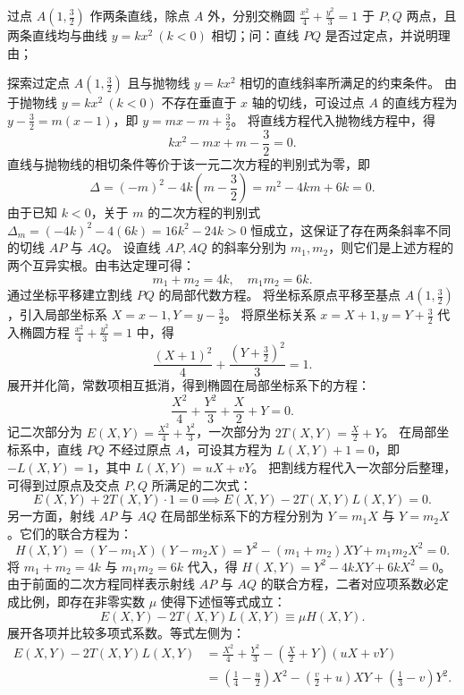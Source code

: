 \begin{example}
过点 \(A\left(1,\frac{3}{2}\right)\) 作两条直线，除点 \(A\) 外，分别交椭圆 \(\frac{x^2}{4} + \frac{y^2}{3} = 1\) 于 \(P,Q\) 两点，且两条直线均与曲线 \(y = kx^2\ (k < 0)\) 相切；问：直线 \(PQ\) 是否过定点，并说明理由；
\end{example}
\begin{solution}
探索过定点 $A\left(1, \frac{3}{2}\right)$ 且与抛物线 $y = kx^2$ 相切的直线斜率所满足的约束条件。
由于抛物线 $y = kx^2\ (k < 0)$ 不存在垂直于 $x$ 轴的切线，可设过点 $A$ 的直线方程为 $y - \frac{3}{2} = m(x - 1)$，即 $y = mx - m + \frac{3}{2}$。
将直线方程代入抛物线方程中，得
\[ kx^2 - mx + m - \frac{3}{2} = 0. \]
直线与抛物线的相切条件等价于该一元二次方程的判别式为零，即
\[ \Delta = (-m)^2 - 4k\left(m - \frac{3}{2}\right) = m^2 - 4km + 6k = 0. \]
由于已知 $k < 0$，关于 $m$ 的二次方程的判别式 $\Delta_m = (-4k)^2 - 4(6k) = 16k^2 - 24k > 0$ 恒成立，这保证了存在两条斜率不同的切线 $AP$ 与 $AQ$。
设直线 $AP, AQ$ 的斜率分别为 $m_1, m_2$，则它们是上述方程的两个互异实根。由韦达定理可得：
\[ m_1 + m_2 = 4k, \quad m_1 m_2 = 6k. \]
通过坐标平移建立割线 $PQ$ 的局部代数方程。
将坐标系原点平移至基点 $A\left(1, \frac{3}{2}\right)$，引入局部坐标系 $X = x - 1, Y = y - \frac{3}{2}$。
将原坐标关系 $x = X + 1, y = Y + \frac{3}{2}$ 代入椭圆方程 $\frac{x^2}{4} + \frac{y^2}{3} = 1$ 中，得
\[ \frac{(X+1)^2}{4} + \frac{\left(Y+\frac{3}{2}\right)^2}{3} = 1. \]
展开并化简，常数项相互抵消，得到椭圆在局部坐标系下的方程：
\[ \frac{X^2}{4} + \frac{Y^2}{3} + \frac{X}{2} + Y = 0. \]
记二次部分为 $E(X,Y) = \frac{X^2}{4} + \frac{Y^2}{3}$，一次部分为 $2T(X,Y) = \frac{X}{2} + Y$。
在局部坐标系中，直线 $PQ$ 不经过原点 $A$，可设其方程为 $L(X,Y) + 1 = 0$，即 $-L(X,Y) = 1$，其中 $L(X,Y) = uX + vY$。
把割线方程代入一次部分后整理，可得到过原点及交点 $P, Q$ 所满足的二次式：
\[ E(X,Y) + 2T(X,Y) \cdot 1 = 0 \implies E(X,Y) - 2T(X,Y)L(X,Y) = 0. \]
另一方面，射线 $AP$ 与 $AQ$ 在局部坐标系下的方程分别为 $Y = m_1 X$ 与 $Y = m_2 X$。它们的联合方程为：
\[ H(X,Y) = (Y - m_1 X)(Y - m_2 X) = Y^2 - (m_1 + m_2)XY + m_1 m_2 X^2 = 0. \]
将 $m_1 + m_2 = 4k$ 与 $m_1 m_2 = 6k$ 代入，得 $H(X,Y) = Y^2 - 4kXY + 6kX^2 = 0$。
由于前面的二次方程同样表示射线 $AP$ 与 $AQ$ 的联合方程，二者对应项系数必定成比例，即存在非零实数 $\mu$ 使得下述恒等式成立：
\[ E(X,Y) - 2T(X,Y)L(X,Y) \equiv \mu H(X,Y). \]
展开各项并比较多项式系数。等式左侧为：
\begin{align*}
E(X,Y) - 2T(X,Y)L(X,Y) &= \frac{X^2}{4} + \frac{Y^2}{3} - \left(\frac{X}{2} + Y\right)(uX + vY) \\
&= \left(\frac{1}{4} - \frac{u}{2}\right)X^2 - \left(\frac{v}{2} + u\right)XY + \left(\frac{1}{3} - v\right)Y^2.

\end{align*}
\end{solution}
